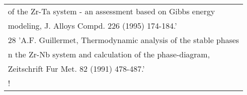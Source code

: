 \begin{longtable}[H]{ l l l }
	\multicolumn{3}{l}{of the Zr-Ta system - an assessment based on Gibbs energy}\\ 
	\multicolumn{3}{l}{modeling, J. Alloys Compd. 226 (1995) 174-184.'}\\
	\multicolumn{3}{l}{28	  'A.F. Guillermet, Thermodynamic analysis of the stable phases}\\ 
	\multicolumn{3}{l}{n the Zr-Nb system and calculation of the phase-diagram,}\\ 
	\multicolumn{3}{l}{Zeitschrift Fur Met. 82 (1991) 478-487.'}\\   
	\multicolumn{3}{l}{!}\\
\end{longtable}